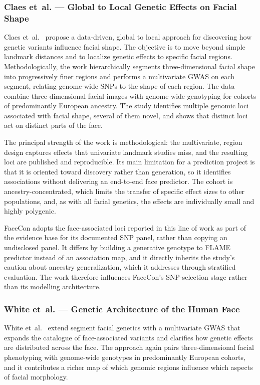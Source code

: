 \subsubsection{Claes et~al. --- Global to Local Genetic Effects on Facial Shape}
Claes et~al.~\cite{ref:claes} propose a data-driven, global to local approach for discovering how genetic variants influence facial shape. The objective is to move beyond simple landmark distances and to localize genetic effects to specific facial regions. Methodologically, the work hierarchically segments three-dimensional facial shape into progressively finer regions and performs a multivariate GWAS on each segment, relating genome-wide SNPs to the shape of each region. The data combine three-dimensional facial images with genome-wide genotyping for cohorts of predominantly European ancestry. The study identifies multiple genomic loci associated with facial shape, several of them novel, and shows that distinct loci act on distinct parts of the face.

The principal strength of the work is methodological: the multivariate, region design captures effects that univariate landmark studies miss, and the resulting loci are published and reproducible. Its main limitation for a prediction project is that it is oriented toward discovery rather than generation, so it identifies associations without delivering an end-to-end face predictor. The cohort is ancestry-concentrated, which limits the transfer of specific effect sizes to other populations, and, as with all facial genetics, the effects are individually small and highly polygenic.

FaceCon adopts the face-associated loci reported in this line of work as part of the evidence base for its documented SNP panel, rather than copying an undisclosed panel. It differs by building a generative genotype to FLAME predictor instead of an association map, and it directly inherits the study's caution about ancestry generalization, which it addresses through stratified evaluation. The work therefore influences FaceCon's SNP-selection stage rather than its modelling architecture.

\subsubsection{White et~al. --- Genetic Architecture of the Human Face}
White et~al.~\cite{ref:white} extend segment facial genetics with a multivariate GWAS that expands the catalogue of face-associated variants and clarifies how genetic effects are distributed across the face. The approach again pairs three-dimensional facial phenotyping with genome-wide genotypes in predominantly European cohorts, and it contributes a richer map of which genomic regions influence which aspects of facial morphology.

